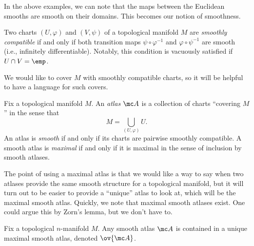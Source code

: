 \documentclass[../notes.tex]{subfiles}
\begin{document}
In the above examples, we can note that the maps between the Euclidean smooths are smooth on their domains. This becomes our notion of smoothness.
\begin{definition}
	Two charts $(U,\varphi)$ and $(V,\psi)$ of a topological manifold $M$ are \textit{smoothly compatible} if and only if both transition maps $\psi\circ\varphi^{-1}$ and $\varphi\circ\psi^{-1}$ are smooth (i.e., infinitely differentiable). Notably, this condition is vacuously satisfied if $U\cap V=\emp$.
\end{definition}
We would like to cover $M$ with smoothly compatible charts, so it will be helpful to have a language for such covers.
\begin{definition}[atlas]
	Fix a topological manifold $M$. An \textit{atlas} $\mc A$ is a collection of charts ``covering $M$'' in the sense that
	\[M=\bigcup_{(U,\varphi)}U.\]
	An atlas is \textit{smooth} if and only if its charts are pairwise smoothly compatible. A smooth atlas is \textit{maximal} if and only if it is maximal in the sense of inclusion by smooth atlases.
\end{definition}
The point of using a maximal atlas is that we would like a way to say when two atlases provide the same smooth structure for a topological manifold, but it will turn out to be easier to provide a ``unique'' atlas to look at, which will be the maximal smooth atlas. Quickly, we note that maximal smooth atlases exist. One could argue this by Zorn's lemma, but we don't have to.
\begin{proposition} \label{prop:get-max-smooth-atlas}
	Fix a topological $n$-manifold $M$. Any smooth atlas $\mc A$ is contained in a unique maximal smooth atlas, denoted $\ov{\mc A}$.
\end{proposition}
\end{document}
